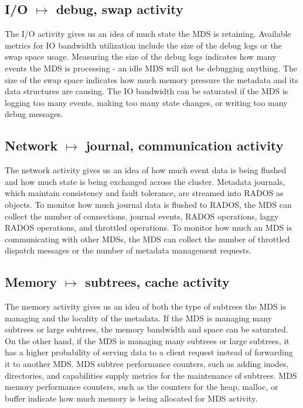 \subsection*{I/O \(\mapsto\) debug, swap activity}
The I/O activity gives us an idea of much state the MDS is retaining. Available metrics for IO bandwidth utilization include the size of the debug logs or the swap space usage. Measuring the size of the debug logs indicates how many events the MDS is processing - an idle MDS will not be debugging anything. The size of the swap space indicates how much memory pressure the metadata and its data structures are causing. The IO bandwidth can be saturated if the MDS is logging too many events, making too many state changes, or writing too many debug messages.

\subsection*{Network \(\mapsto\) journal, communication activity}
The network activity gives us an idea of how much event data is being flushed and how much state is being exchanged across the cluster. Metadata journals, which maintain consistency and fault tolerance, are streamed into RADOS as objects. To monitor how much journal data is flushed to RADOS, the MDS can collect the number of connections, journal events, RADOS operations, laggy RADOS operations, and throttled operations. To monitor how much an MDS is communicating with other MDSs, the MDS can collect the number of throttled dispatch messages or the number of metadata management requests. 

\subsection*{Memory \(\mapsto\) subtrees, cache activity}
The memory activity gives us an idea of both the type of subtrees the MDS is managing and the locality of the metadata. If the MDS is managing many subtrees or large subtrees, the memory bandwidth and space can be saturated. On the other hand, if the MDS is managing many subtrees or large subtrees, it has a higher probability of serving data to a client request instead of forwarding it to another MDS. MDS subtree performance counters, such as adding inodes, directories, and capabilities supply metrics for the maintenance of subtrees.  MDS memory performance counters, such as the counters for the heap, malloc, or buffer indicate how much memory is being allocated for MDS activity. 

